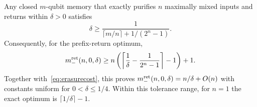 \begin{proposition}\label{prop:spectralreturn}
Any closed $m$-qubit memory that exactly purifies $n$ maximally mixed inputs and returns within $\delta>0$ satisfies
\begin{equation}
 \delta\ge\frac1{\lceil m/n\rceil+1/(2^n-1)}.
 \label{eq:spectralreturn}
\end{equation}
Consequently, for the prefix-return optimum,
\begin{equation}
 m_-^{\rm ret}(n,0,\delta)\ge
 n\left(\left\lceil\frac1\delta-\frac1{2^n-1}\right\rceil-1\right)+1.
 \label{eq:spectralmemory}
\end{equation}
Together with~\eqref{eq:erasurecost}, this proves $m_-^{\rm ret}(n,0,\delta)=n/\delta+O(n)$ with constants uniform for $0<\delta\le1/4$. Within this tolerance range, for $n=1$ the exact optimum is $\lceil1/\delta\rceil-1$.
\end{proposition}
